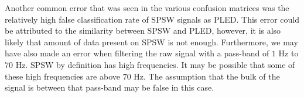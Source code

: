 Another common error that was seen in the various confusion matrices was the relatively high false classification rate of SPSW signals as PLED. This error could be attributed to the similarity between SPSW and PLED, however, it is also likely that amount of data present on SPSW is not enough. Furthermore, we may have also made an error when filtering the raw signal with a pass-band of $1$ Hz to $70$ Hz. SPSW by definition has high frequencies. It may be possible that some of these high frequencies are above $70$ Hz. The assumption that the bulk of the signal is between that pass-band may be false in this case. 




